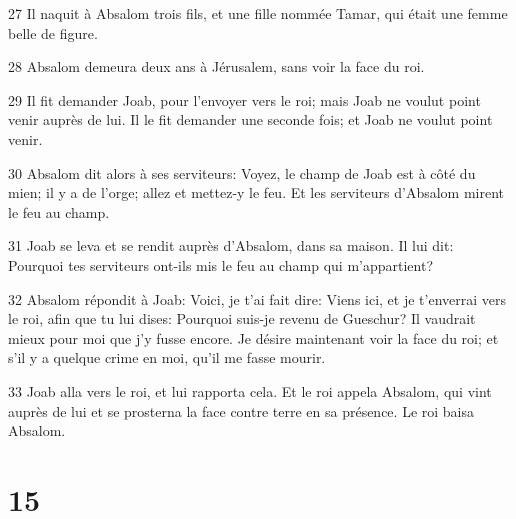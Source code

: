 \par 27 Il naquit à Absalom trois fils, et une fille nommée Tamar, qui était une femme belle de figure.
\par 28 Absalom demeura deux ans à Jérusalem, sans voir la face du roi.
\par 29 Il fit demander Joab, pour l'envoyer vers le roi; mais Joab ne voulut point venir auprès de lui. Il le fit demander une seconde fois; et Joab ne voulut point venir.
\par 30 Absalom dit alors à ses serviteurs: Voyez, le champ de Joab est à côté du mien; il y a de l'orge; allez et mettez-y le feu. Et les serviteurs d'Absalom mirent le feu au champ.
\par 31 Joab se leva et se rendit auprès d'Absalom, dans sa maison. Il lui dit: Pourquoi tes serviteurs ont-ils mis le feu au champ qui m'appartient?
\par 32 Absalom répondit à Joab: Voici, je t'ai fait dire: Viens ici, et je t'enverrai vers le roi, afin que tu lui dises: Pourquoi suis-je revenu de Gueschur? Il vaudrait mieux pour moi que j'y fusse encore. Je désire maintenant voir la face du roi; et s'il y a quelque crime en moi, qu'il me fasse mourir.
\par 33 Joab alla vers le roi, et lui rapporta cela. Et le roi appela Absalom, qui vint auprès de lui et se prosterna la face contre terre en sa présence. Le roi baisa Absalom.

\chapter{15}

